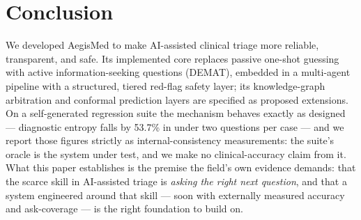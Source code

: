 \documentclass[10pt,twocolumn]{article}
\begin{document}
\section{Conclusion}
We developed AegisMed to make AI-assisted clinical triage more reliable, transparent, and safe. Its implemented core replaces passive one-shot guessing with active information-seeking questions (DEMAT), embedded in a multi-agent pipeline with a structured, tiered red-flag safety layer; its knowledge-graph arbitration and conformal prediction layers are specified as proposed extensions. On a self-generated regression suite the mechanism behaves exactly as designed --- diagnostic entropy falls by 53.7\% in under two questions per case --- and we report those figures strictly as internal-consistency measurements: the suite's oracle is the system under test, and we make no clinical-accuracy claim from it. What this paper establishes is the premise the field's own evidence demands: that the scarce skill in AI-assisted triage is \emph{asking the right next question}, and that a system engineered around that skill --- soon with externally measured accuracy and ask-coverage --- is the right foundation to build on.



\end{document}
